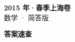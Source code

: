 \documentclass[zihao=-4, a4paper]{ctexart}
\begin{document}
\begin{center}
  {\Large\bfseries 2015 年·春季上海卷}\\[4pt]
  {\large 数学 · 简答版}
\end{center}
\medskip
{}

\clearpage
{}
\begin{center}{\Large\bfseries 答案速查}\end{center}
\medskip

\end{document}
